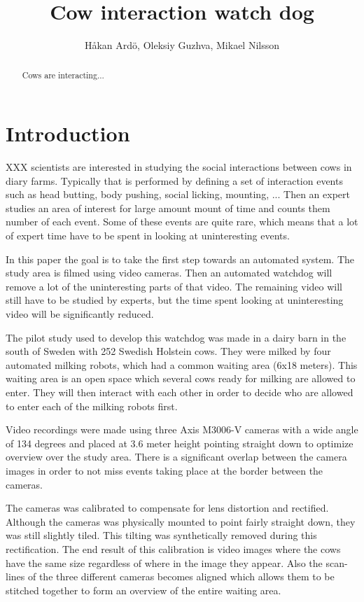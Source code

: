\documentclass[10pt,a4paper,twocolumn]{article}
\author{Håkan Ardö, Oleksiy Guzhva, Mikael Nilsson}
\title{Cow interaction watch dog}
\begin{document}
\maketitle

\begin{abstract}
Cows are interacting...
\end{abstract}

\section{Introduction}

XXX scientists are interested in studying the social interactions between cows in diary farms. Typically that is performed by defining a set of interaction events such as head butting, body pushing, social licking, mounting, ... Then an expert studies an area of interest for large amount mount of time and counts them number of each event. Some of these events are quite rare, which means that a lot of expert time have to be spent in looking at uninteresting events.

In this paper the goal is to take the first step towards an automated system. The study area is filmed using video cameras. Then an automated watchdog will remove a lot of the uninteresting parts of that video. The remaining video will still have to be studied by experts, but the time spent looking at uninteresting video will be significantly reduced.

The pilot study used to develop this watchdog was made in a dairy barn in the south of Sweden with 252 Swedish Holstein cows. They were milked by four automated milking robots, which had a common waiting area (6x18 meters). This waiting area is an open space which several cows ready for milking are allowed to enter. They will then interact with each other in order to decide who are allowed to enter each of the milking robots first.

Video recordings were made using three Axis M3006-V cameras with a wide angle of 134 degrees and placed at 3.6 meter height pointing straight down to optimize overview over the study area. There is a significant overlap between the camera images in order to not miss events taking place at the border between the cameras.

The cameras was calibrated to compensate for lens distortion and rectified. Although the cameras was physically mounted to point fairly straight down, they was still slightly tiled. This tilting was synthetically removed during this rectification. The end result of this calibration is video images where the cows have the same size regardless of where in the image they appear. Also the scan-lines of the three different cameras becomes aligned which allows them to be stitched together to form an overview of the entire waiting area.
\end{document}
